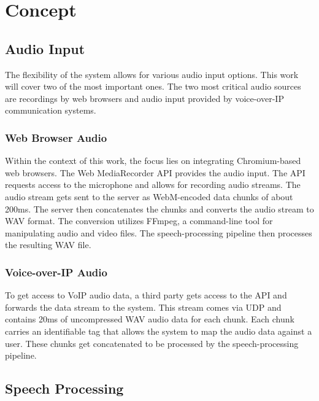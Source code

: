 \chapter{Concept}

\label{Chapter2}


\section{Audio Input}

The flexibility of the system allows for various audio input options. This work will cover two of the most important 
ones. The two most critical audio sources are recordings by web browsers and audio input provided by voice-over-IP 
communication systems.

\subsection{Web Browser Audio}

Within the context of this work, the focus lies on integrating Chromium-based web browsers. The Web MediaRecorder API 
provides the audio input. The API requests access to the microphone and allows for recording audio streams. 
The audio stream gets sent to the server as WebM-encoded data chunks of about 200ms. The server then concatenates the 
chunks and converts the audio stream to WAV format. The conversion utilizes FFmpeg, a command-line tool for 
manipulating audio and video files. The speech-processing pipeline then processes the resulting WAV file.

\subsection{Voice-over-IP Audio}

To get access to VoIP audio data, a third party gets access to the API and forwards the data stream to the system. 
This stream comes via UDP and contains 20ms of uncompressed WAV audio data for each chunk.
Each chunk carries an identifiable tag that allows the system to map the audio data against a user.
These chunks get concatenated to be processed by the speech-processing pipeline.


\section{Speech Processing}

